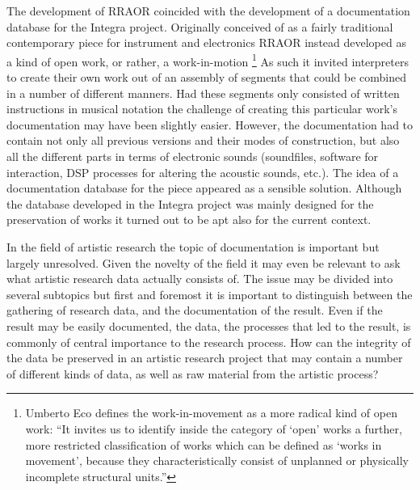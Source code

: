 \documentclass[12pt]{article}
\begin{document}
The development of RRAOR coincided with the development of a documentation database for the Integra project. Originally conceived of as a fairly traditional contemporary piece for instrument and electronics RRAOR instead developed as a kind of open work, or rather, a work-in-motion \footnote{Umberto Eco defines the work-in-movement as a more radical kind of open work: ``It invites us to identify inside the category of `open' works a further, more restricted classification of works which can be defined as `works in movement', because they characteristically consist of unplanned or physically incomplete structural units.''} As such it invited interpreters to create their own work out of an assembly of segments that could be combined in a number of different manners. Had these segments only consisted of written instructions in musical notation the challenge of creating this particular work's documentation may have been slightly easier. However, the documentation had to contain not only all previous versions and their modes of construction, but also all the different parts in terms of electronic sounds (soundfiles, software for interaction, DSP processes for altering the acoustic sounds, etc.). The idea of a documentation database for the piece appeared as a sensible solution. Although the database developed in the Integra project was mainly designed for the preservation of works it turned out to be apt also for the current context.

In the field of artistic research the topic of documentation is important but largely unresolved. Given the novelty of the field it may even be relevant to ask what artistic research data actually consists of. The issue may be divided into several subtopics but first and foremost it is important to distinguish between the gathering of research data, and the documentation of the result. Even if the result may be easily documented, the data, the processes that led to the result, is commonly of central importance to the research process. How can the integrity of the data be preserved in an artistic research project that may contain a number of different kinds of data, as well as raw material from the artistic process? 
\end{document}
